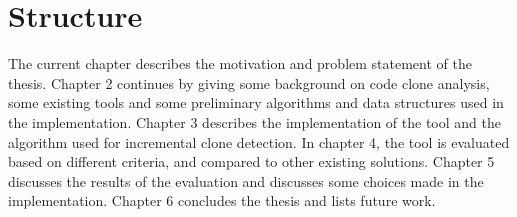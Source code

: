 \section{Structure}

The current chapter describes the motivation and problem statement of the thesis. Chapter
2 continues by giving some background on code clone analysis, some existing
tools and some preliminary algorithms and data structures used in the implementation.
Chapter 3 describes the implementation of the tool and the algorithm used for
incremental clone detection. In chapter 4, the tool is evaluated based on different
criteria, and compared to other existing solutions. Chapter 5 discusses the results of the
evaluation and discusses some choices made in the implementation. Chapter 6
concludes the thesis and lists future work.
